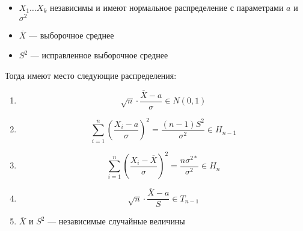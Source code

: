 \begin{theorem}[основная]\itemfix
    \label{основная}
    \begin{itemize}
        \item \(X_1 \dots X_k\) независимы и имеют нормальное распределение с параметрами \(a\) и \(\sigma^2\)
        \item \(\overline{X}\) --- выборочное среднее
        \item \(S^2\) --- исправленное выборочное среднее
    \end{itemize}

    Тогда имеют место следующие распределения:
    \begin{enumerate}
        \item \[\sqrt{n} \cdot \frac{\overline{X} - a}{\sigma} \in N(0, 1)\]
        \item \[\sum_{i=1}^{n} \left(\frac{X_i - a}{\sigma}\right)^2 = \frac{(n - 1) S^2}{\sigma^2} \in H_{n-1}\]
        \item \[\sum_{i=1}^{n} \left(\frac{X_i - \overline{X}}{\sigma}\right)^2 = \frac{n \sigma^{2*}}{\sigma^2} \in H_n\]
        \item \[\sqrt{n} \cdot \frac{\overline{X} - a}{S} \in T_{n-1}\]
        \item \(\overline{X}\) и \(S^2\) --- независимые случайные величины
    \end{enumerate}
\end{theorem}
